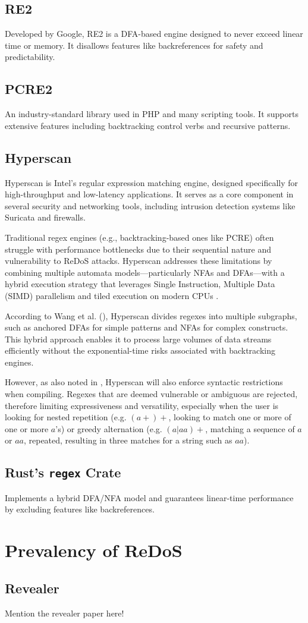 \subsection{RE2}
Developed by Google, RE2 is a DFA-based engine designed to never exceed linear time or memory. It disallows features like backreferences for safety and predictability. 

\subsection{PCRE2}
An industry-standard library used in PHP and many scripting tools. It supports extensive features including backtracking control verbs and recursive patterns. %

\subsection{Hyperscan}
Hyperscan is Intel’s regular expression matching engine, designed specifically for high-throughput and low-latency applications. It serves as a core component in several security and networking tools, including intrusion detection systems like Suricata and firewalls.

Traditional regex engines (e.g., backtracking-based ones like PCRE) often struggle with performance bottlenecks due to their sequential nature and vulnerability to ReDoS attacks. Hyperscan addresses these limitations by combining multiple automata models—particularly NFAs and DFAs—with a hybrid execution strategy that leverages Single Instruction, Multiple Data (SIMD) parallelism and tiled execution on modern CPUs .

According to Wang et al. (\cite{hyperscan}), Hyperscan divides regexes into multiple subgraphs, such as anchored DFAs for simple patterns and NFAs for complex constructs. This hybrid approach enables it to process large volumes of data streams efficiently without the exponential-time risks associated with backtracking engines.

However, as also noted in \cite{hyperscan}, Hyperscan will also enforce syntactic restrictions when compiling. Regexes that are deemed vulnerable or ambiguous are rejected, therefore limiting expressiveness and versatility, especially when the user is looking for nested repetition (e.g. $(a+)+$, looking to match one or more of one or more $a$'s) or greedy alternation (e.g. $(a|aa)+$, matching a sequence of $a$ or $aa$, repeated, resulting in three matches for a string such as $aa$).

\subsection{Rust's \texttt{regex} Crate}
Implements a hybrid DFA/NFA model and guarantees linear-time performance by excluding features like backreferences.

\section{Prevalency of ReDoS}
\subsection{Revealer}
Mention the revealer paper here!
